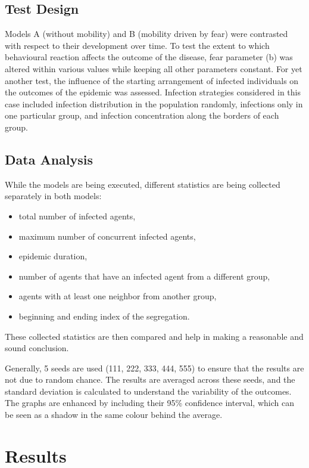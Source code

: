\documentclass[11pt,a4paper]{article}
\begin{document}
\subsection{Test Design}

Models A (without mobility) and B (mobility driven by fear) were contrasted with respect to their development over time.
To test the extent to which behavioural reaction affects the outcome of the disease, fear parameter (b) was altered within various values while keeping all other parameters constant.
For yet another test, the influence of the starting arrangement of infected individuals on the outcomes of the epidemic was assessed. Infection strategies considered in this case included infection distribution in the population randomly, infections only in one particular group, and infection concentration along the borders of each group.



\subsection{Data Analysis}
While the models are being executed, different statistics are being collected separately in both models:
\begin{itemize}
    \item total number of infected agents,
    \item maximum number of concurrent infected agents,
    \item epidemic duration,
    \item number of agents that have an infected agent from a different group,
    \item agents with at least one neighbor from another group,
    \item beginning and ending index of the segregation.
\end{itemize}
These collected statistics are then compared and help in making a reasonable and sound conclusion.

Generally, 5 seeds are used (111, 222, 333, 444, 555) to ensure that the results are not due to random chance. The results are averaged across these seeds, and the standard deviation is calculated to understand the variability of the outcomes.
The graphs are enhanced by including their 95\% confidence interval, which can be seen as a shadow in the same colour behind the average. 

\section{Results}
\end{document}
